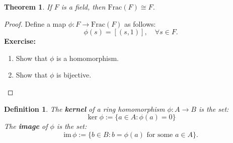\documentclass[a4paper,12pt]{report}
\newcommand{\Frac}{\mathrm{Frac}}
\newcommand{\im}{\mathrm{im}\,}
\newcounter{statement}
\numberwithin{statement}{chapter}
\newtheorem{thm}[statement]{Theorem}
\newtheorem{defn}[statement]{Definition}
\numberwithin{equation}{chapter}
\numberwithin{section}{chapter}
\numberwithin{subsection}{section}
\begin{document}
\begin{thm}
If $F$ is a field, then $\Frac(F) \cong F$.
\end{thm}
\begin{proof}

Define a map $\phi : F \rightarrow \Frac(F)$ as follows:
\[
\phi(s) = [(s, 1)],\quad \forall s \in F.
\]
 {\bf Exercise:} 

\begin{enumerate}
\item 
Show that $\phi$ is a homomorphism.

\item 
Show that $\phi$ is bijective.
\end{enumerate}


\end{proof}




\begin{defn}
The  {\bf kernel}  of a ring homomorphism $\phi : A \rightarrow B$
is the set:
\[
\ker \phi := \{a \in A : \phi(a) = 0\}
\]
The  {\bf image}  of $\phi$ is the set:
\[
\im \phi := \{b \in B : b = \phi(a) \text{ for some } a \in A\}.
\]
\end{defn}
\end{document}
